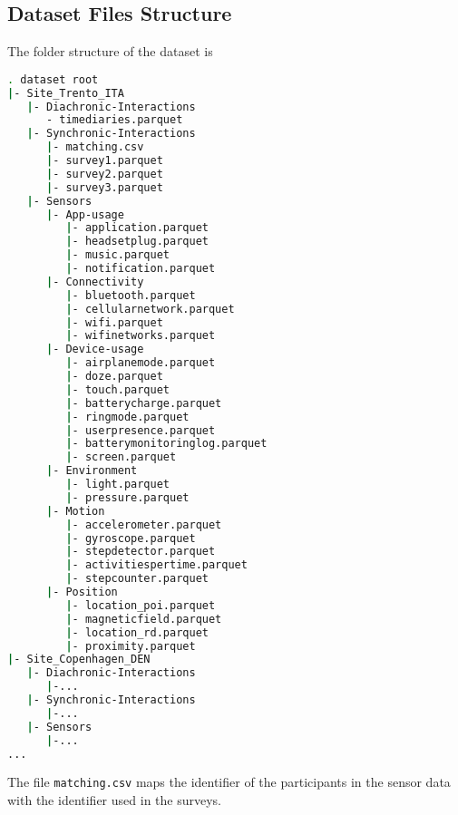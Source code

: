 




\subsection{Dataset Files Structure}

The folder structure of the dataset is

\begin{lstlisting}[language=bash]
. dataset root
|- Site_Trento_ITA
   |- Diachronic-Interactions
      - timediaries.parquet
   |- Synchronic-Interactions
      |- matching.csv
      |- survey1.parquet
      |- survey2.parquet
      |- survey3.parquet
   |- Sensors
      |- App-usage
         |- application.parquet
         |- headsetplug.parquet
         |- music.parquet
         |- notification.parquet
      |- Connectivity
         |- bluetooth.parquet
         |- cellularnetwork.parquet
         |- wifi.parquet
         |- wifinetworks.parquet
      |- Device-usage
         |- airplanemode.parquet
         |- doze.parquet
         |- touch.parquet
         |- batterycharge.parquet
         |- ringmode.parquet
         |- userpresence.parquet
         |- batterymonitoringlog.parquet
         |- screen.parquet
      |- Environment
         |- light.parquet
         |- pressure.parquet
      |- Motion
         |- accelerometer.parquet
         |- gyroscope.parquet
         |- stepdetector.parquet
         |- activitiespertime.parquet
         |- stepcounter.parquet
      |- Position
         |- location_poi.parquet
         |- magneticfield.parquet
         |- location_rd.parquet
         |- proximity.parquet
|- Site_Copenhagen_DEN
   |- Diachronic-Interactions
      |-...
   |- Synchronic-Interactions
      |-...
   |- Sensors
      |-...
...
\end{lstlisting}
%
The file \texttt{matching.csv} maps the identifier of the participants in the sensor data with the identifier used in the surveys.

